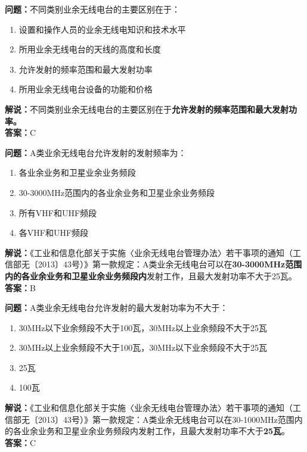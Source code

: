 \bigskip


\noindent\textbf{问题：}不同类别业余无线电台的主要区别在于：
\begin{enumerate}[label=\Alph*), leftmargin=3em]
	\item 设置和操作人员的业余无线电知识和技术水平
	\item 所用业余无线电台的天线的高度和长度
	\item 允许发射的频率范围和最大发射功率
	\item 所用业余无线电台设备的功能和价格
\end{enumerate}
\noindent\textbf{解说：}不同类别业余无线电台的主要区别在于\textbf{允许发射的频率范围和最大发射功率。}\\\noindent\textbf{答案：}C



\bigskip


\noindent\textbf{问题：}A类业余无线电台允许发射的发射频率为：
\begin{enumerate}[label=\Alph*), leftmargin=3em]
	\item 各业余业务和卫星业余业务频段
	\item 30-3000MHz范围内的各业余业务和卫星业余业务频段
	\item 所有VHF和UHF频段
	\item 各VHF和UHF频段
\end{enumerate}
\noindent\textbf{解说：}《工业和信息化部关于实施〈业余无线电台管理办法〉若干事项的通知（工信部无〔2013〕43号）》第一款规定：A类业余无线电台可以在\textbf{30-3000MHz范围内的各业余业务和卫星业余业务频段内}发射工作，且最大发射功率不大于25瓦。\\\noindent\textbf{答案：}B


\bigskip


\noindent\textbf{问题：}A类业余无线电台允许发射的最大发射功率为不大于：
\begin{enumerate}[label=\Alph*), leftmargin=3em]
	\item 30MHz以下业余频段不大于100瓦，30MHz以上业余频段不大于25瓦
	\item 30MHz以上业余频段不大于100瓦，30MHz以下业余频段不大于25瓦
	\item 25瓦
	\item 100瓦
\end{enumerate}
\noindent\textbf{解说：}《工业和信息化部关于实施〈业余无线电台管理办法〉若干事项的通知（工信部无〔2013〕43号）》第一款规定：A类业余无线电台可以在30-1000MHz范围内的各业余业务和卫星业余业务频段内发射工作，且最大发射功率不大于\textbf{25瓦}。\\\noindent\textbf{答案：}C


